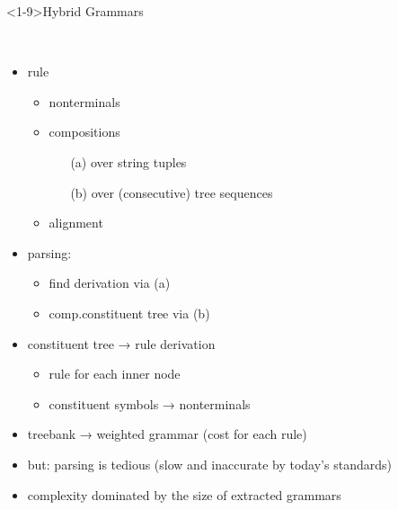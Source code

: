 \documentclass[aspectratio=169, 10pt]{beamer}
\begin{document}
    \begin{frame}<1-9>{Hybrid Grammars \cite{VogDre,Geb,Geb}}
        \begin{minipage}{.58\linewidth}
            \begin{overprint}
                    \resizebox{\linewidth}{!}{
                        }
                    \resizebox{\linewidth}{!}{
                        }\\
                    \resizebox{\linewidth}{!}{
                        }
            \end{overprint}
        \end{minipage}
        \begin{minipage}{.4\linewidth}
            \begin{itemize}
                \item rule
                    \begin{itemize}
                        \item nonterminals
                        \item compositions
                            \begin{itemize}
                                \item[(a)] over string tuples
                                \item[(b)] over (consecutive) tree sequences
                            \end{itemize}
                        \item alignment
                    \end{itemize}
                \item parsing:
                \begin{itemize}
                    \item find derivation via (a)
                    \item comp.\@ constituent tree via (b)
                \end{itemize}

                \item constituent tree → rule derivation
                \begin{itemize}
                    \item rule for each inner node
                    \item constituent symbols → nonterminals
                \end{itemize}
                \item treebank → weighted grammar (cost for each rule) \cite{}
                \item but: parsing is tedious (slow and inaccurate by today's standards) \cite{}
                \item complexity dominated by the size of extracted grammars \cite{}
            \end{itemize}
        \end{minipage}


\end{frame}
\end{document}
